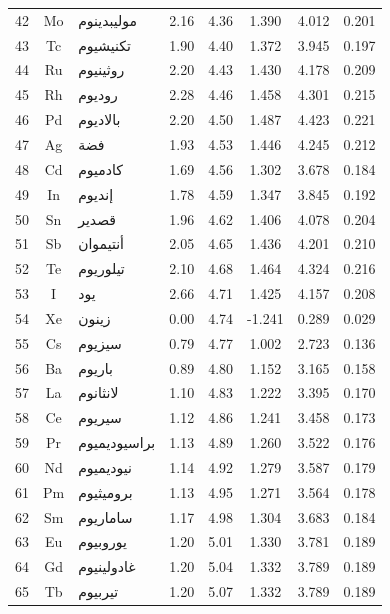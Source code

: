 \documentclass[12pt,a4paper]{article}
\theoremstyle{remark}
\begin{document}
\begin{longtable}{|c|c|p{2.5cm}|c|c|c|c|c|}
		42 & Mo & موليبدينوم    & 2.16 & 4.36 & 1.390  & 4.012  & 0.201 \\
		43 & Tc & تكنيشيوم      & 1.90 & 4.40 & 1.372  & 3.945  & 0.197 \\
		44 & Ru & روثينيوم      & 2.20 & 4.43 & 1.430  & 4.178  & 0.209 \\
		45 & Rh & روديوم        & 2.28 & 4.46 & 1.458  & 4.301  & 0.215 \\
		46 & Pd & بالاديوم      & 2.20 & 4.50 & 1.487  & 4.423  & 0.221 \\
		47 & Ag & فضة           & 1.93 & 4.53 & 1.446  & 4.245  & 0.212 \\
		48 & Cd & كادميوم       & 1.69 & 4.56 & 1.302  & 3.678  & 0.184 \\
		49 & In & إنديوم        & 1.78 & 4.59 & 1.347  & 3.845  & 0.192 \\
		50 & Sn & قصدير         & 1.96 & 4.62 & 1.406  & 4.078  & 0.204 \\
		51 & Sb & أنتيموان      & 2.05 & 4.65 & 1.436  & 4.201  & 0.210 \\
		52 & Te & تيلوريوم      & 2.10 & 4.68 & 1.464  & 4.324  & 0.216 \\
		53 & I  & يود           & 2.66 & 4.71 & 1.425  & 4.157  & 0.208 \\
		54 & Xe & زينون         & 0.00 & 4.74 & -1.241 & 0.289  & 0.029 \\
		55 & Cs & سيزيوم        & 0.79 & 4.77 & 1.002  & 2.723  & 0.136 \\
		56 & Ba & باريوم        & 0.89 & 4.80 & 1.152  & 3.165  & 0.158 \\
		57 & La & لانثانوم      & 1.10 & 4.83 & 1.222  & 3.395  & 0.170 \\
		58 & Ce & سيريوم        & 1.12 & 4.86 & 1.241  & 3.458  & 0.173 \\
		59 & Pr & براسيوديميوم  & 1.13 & 4.89 & 1.260  & 3.522  & 0.176 \\
		60 & Nd & نيوديميوم     & 1.14 & 4.92 & 1.279  & 3.587  & 0.179 \\
		61 & Pm & بروميثيوم     & 1.13 & 4.95 & 1.271  & 3.564  & 0.178 \\
		62 & Sm & ساماريوم      & 1.17 & 4.98 & 1.304  & 3.683  & 0.184 \\
		63 & Eu & يوروبيوم      & 1.20 & 5.01 & 1.330  & 3.781  & 0.189 \\
		64 & Gd & غادولينيوم    & 1.20 & 5.04 & 1.332  & 3.789  & 0.189 \\
		65 & Tb & تيربيوم       & 1.20 & 5.07 & 1.332  & 3.789  & 0.189 \\

\end{longtable}
\end{document}
